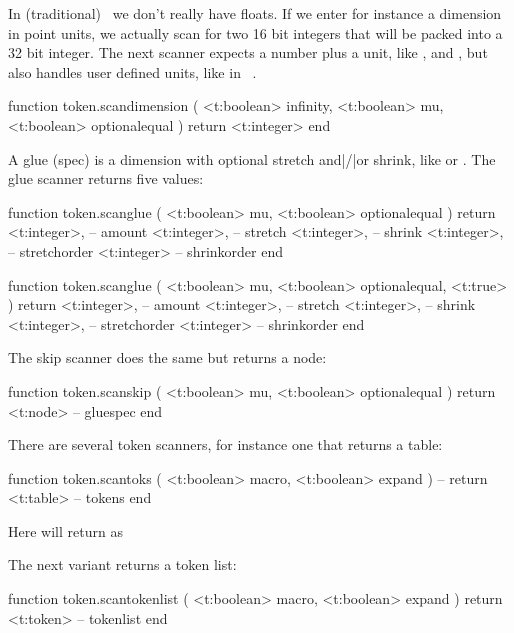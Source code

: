 In (traditional) \TEX\ we don't really have floats. If we enter for instance a
dimension in point units, we actually scan for two 16 bit integers that will be
packed into a 32 bit integer. The next scanner expects a number plus a unit, like
,  and , but also handles user defined units, like
in \CONTEXT\ .

\starttyping[option=LUA]
function token.scandimension (
    <t:boolean> infinity,
    <t:boolean> mu,
    <t:boolean> optionalequal
)
    return <t:integer>
end
\stoptyping

A glue (spec) is a dimension with optional stretch and|/|or shrink, like  or . The glue scanner returns five values:

\starttyping[option=LUA]
function token.scanglue (
    <t:boolean> mu,
    <t:boolean> optionalequal
)
    return
        <t:integer>, -- amount
        <t:integer>, -- stretch
        <t:integer>, -- shrink
        <t:integer>, -- stretchorder
        <t:integer>  -- shrinkorder
end

function token.scanglue (
    <t:boolean> mu,
    <t:boolean> optionalequal,
    <t:true>
)
    return {
        <t:integer>, -- amount
        <t:integer>, -- stretch
        <t:integer>, -- shrink
        <t:integer>, -- stretchorder
        <t:integer>  -- shrinkorder
    }
end
\stoptyping

The skip scanner does the same but returns a  node:

\starttyping[option=LUA]
function token.scanskip (
    <t:boolean> mu,
    <t:boolean> optionalequal
)
    return <t:node> -- gluespec
end
\stoptyping

There are several token scanners, for instance one that returns a table:

\starttyping[option=LUA]
function token.scantoks (
    <t:boolean> macro,
    <t:boolean> expand
)
    -- return <t:table> -- tokens
end
\stoptyping

Here  will return  as

\stoptyping

The next variant returns a token list:

\starttyping[option=LUA]
function token.scantokenlist (
    <t:boolean> macro,
    <t:boolean> expand
)
    return <t:token> -- tokenlist
end
\stoptyping

